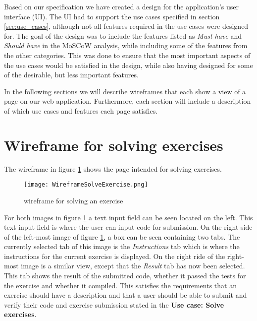 Based on our specification we have created a design for the application's user interface (UI). The UI had to support the use cases specified in section \ref*{sec:use_cases}, although not all features required in the use cases were designed for. The goal of the design was to include the features listed as \textit{Must have} and \textit{Should have} in the MoSCoW analysis, while including some of the features from the other categories. This was done to ensure that the most important aspects of the use cases would be satisfied in the design, while also having designed for some of the desirable, but less important features.

In the following sections we will describe wireframes that each show a view of a page on our web application. Furthermore, each section will include a description of which use cases and features each page satisfies. 

\section{Wireframe for solving exercises}
The wireframe in figure \ref{fig:wfExercise} shows the page intended for solving exercises.
\begin{figure}[H]
	\texttt{[image: WireframeSolveExercise.png]}
	\centering
	\caption{wireframe for solving an exercise}
	\label{fig:wfExercise}
\end{figure}

For both images in figure \ref{fig:wfExercise} a text input field can be seen located on the left. This text input field is where the user can input code for submission. On the right side of the left-most image of figure \ref{fig:wfExercise}, a box can be seen containing two tabs. The currently selected tab of this image is the \textit{Instructions} tab which is where the instructions for the current exercise is displayed. On the right ride of the right-most image is a similar view, except that the \textit{Result} tab has now been selected. This tab shows the result of the submitted code, whether it passed the tests for the exercise and whether it compiled. This satisfies the requirements that an exercise should have a description and that a user should be able to submit and verify their code and exercise submission stated in the \textbf{Use case: Solve exercises}.

